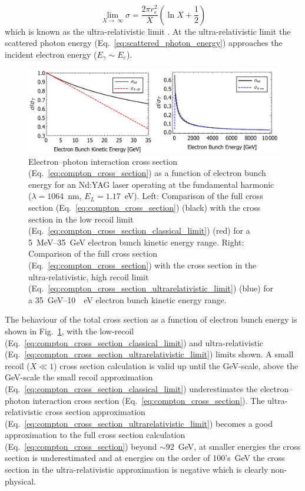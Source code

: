 \documentclass[../main.tex]{subfiles}
\begin{document}
\begin{equation}
\lim_{X \to ~\infty} \sigma = \frac{2\pi r_{e}^{2}}{X}\left(\ln{X}+\frac{1}{2}\right)
\label{eq:compton_cross_section_ultrarelativistic_limit}
\end{equation}
which is known as the ultra-relativistic limit \cite{curatolo2017analytical}. At the ultra-relativistic limit the scattered photon energy (Eq.~\ref{eq:scattered_photon_energy}) approaches the incident electron energy ($E_{\gamma}\sim E_{e}$).
\begin{figure}[!h]
\centering
\includegraphics[width=\textwidth]{Figures/Photon_Production_by_Inverse_Compton_Scattering/Cross_Section_Electron_Bunch_Energy_NDYAG.pdf}
\caption{Electron--photon interaction cross section (Eq.~\ref{eq:compton_cross_section}) as a function of electron bunch energy for an Nd:YAG laser operating at the fundamental harmonic ($\lambda = 1064$~\si{\nano\meter}, $E_{L} = 1.17$~\si{\electronvolt}). Left: Comparison of the full cross section (Eq.~\ref{eq:compton_cross_section}) (black) with the cross section in the low recoil limit (Eq.~\ref{eq:compton_cross_section_classical_limit}) (red) for a 5~\si{\mega\electronvolt}--35~\si{\giga\electronvolt} electron bunch kinetic energy range. Right: Comparison of the full cross section (Eq.~\ref{eq:compton_cross_section}) with the cross section in the ultra-relativistic, high recoil limit (Eq.~\ref{eq:compton_cross_section_ultrarelativistic_limit}) (blue) for a 35~\si{\giga\electronvolt}--10~\si{\terra\electronvolt} electron bunch kinetic energy range.}
\label{fig:cross_section_electron_energy}
\end{figure}

The behaviour of the total cross section as a function of electron bunch energy is shown in Fig.~\ref{fig:cross_section_electron_energy}, with the low-recoil (Eq.~\ref{eq:compton_cross_section_classical_limit}) and ultra-relativistic (Eq.~\ref{eq:compton_cross_section_ultrarelativistic_limit}) limits shown. A small recoil ($X \ll 1$) cross section calculation is valid up until the \si{\giga\electronvolt}-scale, above the \si{\giga\electronvolt}-scale the small recoil approximation (Eq.~\ref{eq:compton_cross_section_classical_limit}) underestimates the electron--photon interaction cross section (Eq.~\ref{eq:compton_cross_section}). The ultra-relativistic cross section approximation (Eq.~\ref{eq:compton_cross_section_ultrarelativistic_limit}) becomes a good approximation to the full cross section calculation (Eq.~\ref{eq:compton_cross_section}) beyond  $\sim92$~\si{\giga\electronvolt}, at smaller energies the cross section is underestimated and at energies on the order of 100's~\si{\giga\electronvolt} the cross section in the ultra-relativistic approximation is negative which is clearly non-physical.     
\end{document}
